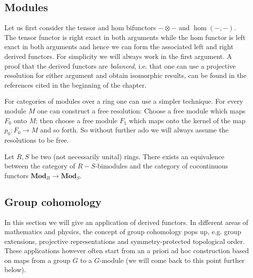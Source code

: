 \subsection{Modules}\label{section:tor_ext}

	Let us first consider the tensor and hom bifunctors $-\otimes-$ and $\hom(-, -)$. The tensor functor is right exact in both arguments while the hom functor is left exact in both arguments and hence we can form the associated left and right derived functors. For simplicity we will always work in the first argument. A proof that the derived functors are \textit{balanced}, i.e. that one can use a projective resolution for either argument and obtain isomorphic results, can be found in the references cited in the beginning of the chapter.



	For categories of modules over a ring one can use a simpler technique. For every module $M$ one can construct a free resolution: Choose a free module which maps $F_0$ onto $M$; then choose a free module $F_1$ which maps onto the kernel of the map $p_0:F_0\rightarrow M$ and so forth. So without further ado we will always assume the resolutions to be free.

    \begin{theorem}
        Let $R,S$ be two (not necessarily unital) rings. There exists an equivalence between the category of $R-S$-bimodules and the category of cocontinuous functors $\mathbf{Mod}_R\rightarrow\mathbf{Mod}_S$.
    \end{theorem}

\subsection{Group cohomology}\label{section:group_cohomology}

	In this section we will give an application of derived functors. In different areas of mathematics and physics, the concept of group cohomology pops up, e.g. group extensions, projective representations and symmetry-protected topological order. These applications however often start from an a priori ad hoc construction based on maps from a group $G$ to a $G$-module (we will come back to this point further below).

